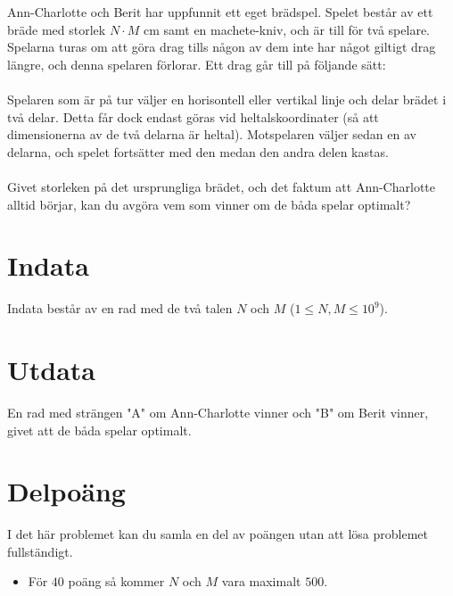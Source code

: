 
Ann-Charlotte och Berit har uppfunnit ett eget brädspel. Spelet består av ett bräde med storlek $N\cdot{M}$ cm samt en machete-kniv, och är till för två spelare. Spelarna turas om att göra drag tills någon av dem inte har något giltigt drag längre, och denna spelaren förlorar. Ett drag går till på följande sätt:
\\\\
Spelaren som är på tur väljer en horisontell eller vertikal linje och delar brädet i två delar. Detta får dock endast göras vid heltalskoordinater (så att dimensionerna av de två delarna är heltal). Motspelaren väljer sedan en av delarna, och spelet fortsätter med den medan den andra delen kastas.
\\\\
Givet storleken på det ursprungliga brädet, och det faktum att Ann-Charlotte alltid börjar, kan du avgöra vem som vinner om de båda spelar optimalt?

\section*{Indata}
Indata består av en rad med de två talen $N$ och $M$ ($1 \le N,M \le 10^9$).

\section*{Utdata}

En rad med strängen "A" om Ann-Charlotte vinner och "B" om Berit vinner, givet att de båda spelar optimalt.

\section*{Delpoäng}

I det här problemet kan du samla en del av poängen utan att
lösa problemet fullständigt.

\begin{itemize}
    \item För $40$ poäng så kommer $N$ och $M$ vara maximalt $500$.
\end{itemize}
